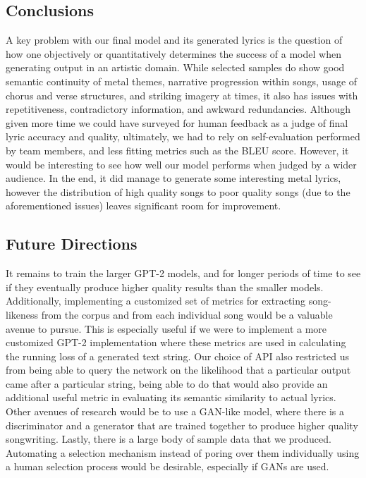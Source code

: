 \documentclass[11pt]{article}
\begin{document}
\subsection{Conclusions}

A key problem with our final model and its generated lyrics is the question of how one objectively or quantitatively determines the success of a model when generating output in an artistic domain. While selected samples do show good semantic continuity of metal themes, narrative progression within songs, usage of chorus and verse structures, and striking imagery at times, it also has issues with repetitiveness, contradictory information, and awkward redundancies. Although given more time we could have surveyed for human feedback as a judge of final lyric accuracy and quality, ultimately, we had to rely on self-evaluation performed by team members, and less fitting metrics such as the BLEU score. However, it would be interesting to see how well our model performs when judged by a wider audience. In the end, it did manage to generate some interesting metal lyrics, however the distribution of high quality songs to poor quality songs (due to the aforementioned issues) leaves significant room for improvement.


\subsection{Future Directions}

It remains to train the larger GPT-2 models, and for longer periods of time to see if they eventually produce higher quality results than the smaller models. Additionally, implementing a customized set of metrics for extracting song-likeness from the corpus and from each individual song would be a valuable avenue to pursue. This is especially useful if we were to implement a more customized GPT-2 implementation where these metrics are used in calculating the running loss of a generated text string. Our choice of API also restricted us from being able to query the network on the likelihood that a particular output came after a particular string, being able to do that would also provide an additional useful metric in evaluating its semantic similarity to actual lyrics. Other avenues of research would be to use a GAN-like model, where there is a discriminator and a generator that are trained together to produce higher quality songwriting. Lastly, there is a large body of sample data that we produced. Automating a selection mechanism instead of poring over them individually using a human selection process would be desirable, especially if GANs are used.
\end{document}
